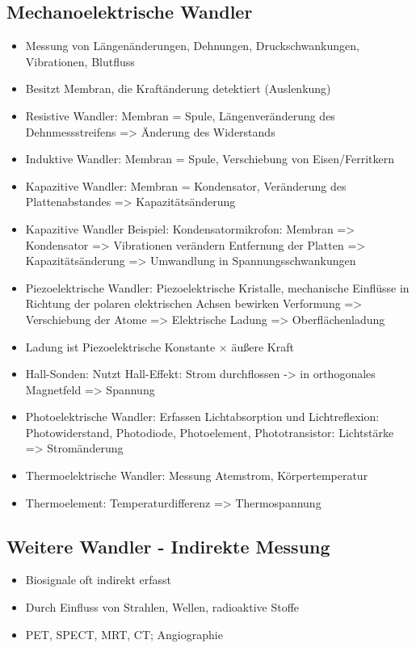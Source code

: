 \documentclass[a4paper,10pt,oneside]{article}
\begin{document}
\subsection{Mechanoelektrische Wandler}
\begin{itemize}
	\item Messung von Längenänderungen, Dehnungen, Druckschwankungen, Vibrationen, Blutfluss
	\item Besitzt Membran, die Kraftänderung detektiert (Auslenkung)
	\item Resistive Wandler: Membran = Spule, Längenveränderung des Dehnmessstreifens => Änderung des Widerstands
	\item Induktive Wandler: Membran = Spule, Verschiebung von Eisen/Ferritkern
	\item Kapazitive Wandler: Membran = Kondensator, Veränderung des Plattenabstandes => Kapazitätsänderung
	\item Kapazitive Wandler Beispiel: Kondensatormikrofon: Membran => Kondensator => Vibrationen verändern Entfernung der Platten => Kapazitätsänderung => Umwandlung in Spannungsschwankungen
	\item Piezoelektrische Wandler: Piezoelektrische Kristalle, mechanische Einflüsse in Richtung der polaren elektrischen Achsen bewirken Verformung => Verschiebung der Atome => Elektrische Ladung => Oberflächenladung
	\item Ladung ist Piezoelektrische Konstante $\times$ äußere Kraft
	\item Hall-Sonden: Nutzt Hall-Effekt: Strom durchflossen -> in orthogonales Magnetfeld => Spannung
	\item Photoelektrische Wandler: Erfassen Lichtabsorption und Lichtreflexion: Photowiderstand, Photodiode, Photoelement, Phototransistor: Lichtstärke => Stromänderung
	\item Thermoelektrische Wandler: Messung Atemstrom, Körpertemperatur
	\item Thermoelement: Temperaturdifferenz => Thermospannung
\end{itemize}

\subsection{Weitere Wandler - Indirekte Messung}
\begin{itemize}
	\item Biosignale oft indirekt erfasst
	\item Durch Einfluss von Strahlen, Wellen, radioaktive Stoffe
	\item PET, SPECT, MRT, CT; Angiographie
\end{itemize}
\end{document}
